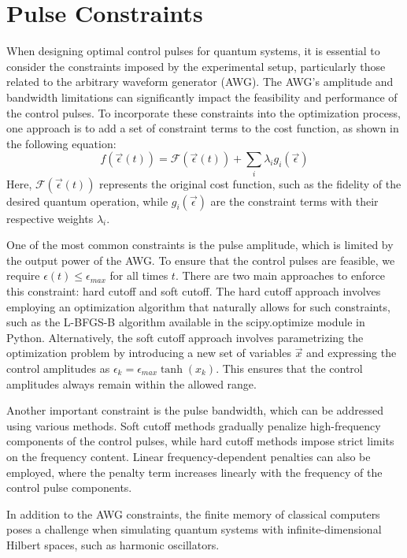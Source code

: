 \documentclass[12pt]{report}
\begin{document}
\section{Pulse Constraints} \label{sec:pulse_constraints}
When designing optimal control pulses for quantum systems, it is essential to consider the constraints imposed by the experimental setup, particularly those related to the arbitrary waveform generator (AWG). 
The AWG's amplitude and bandwidth limitations can significantly impact the feasibility and performance of the control pulses. 
To incorporate these constraints into the optimization process, one approach is to add a set of constraint terms to the cost function, as shown in the following equation:
\begin{equation*}
    f(\vec{\epsilon}(t)) = \mathcal{F}(\vec{\epsilon}(t)) + \sum_i \lambda_i g_i(\vec{\epsilon})
\end{equation*}
Here, $\mathcal{F}(\vec{\epsilon}(t))$ represents the original cost function, such as the fidelity of the desired quantum operation, while $g_i(\vec{\epsilon})$ are the constraint terms with their respective weights $\lambda_i$.
\par
One of the most common constraints is the pulse amplitude, which is limited by the output power of the AWG. 
To ensure that the control pulses are feasible, we require $\epsilon(t) \le \epsilon_{max}$ for all times $t$. 
There are two main approaches to enforce this constraint: hard cutoff and soft cutoff. 
The hard cutoff approach involves employing an optimization algorithm that naturally allows for such constraints, such as the L-BFGS-B algorithm available in the scipy.optimize module in Python. 
Alternatively, the soft cutoff approach involves parametrizing the optimization problem by introducing a new set of variables $\vec{x}$ and expressing the control amplitudes as $\epsilon_k = \epsilon_{max} \tanh{(x_k)}$. 
This ensures that the control amplitudes always remain within the allowed range.
\par
Another important constraint is the pulse bandwidth, which can be addressed using various methods. 
Soft cutoff methods gradually penalize high-frequency components of the control pulses, while hard cutoff methods impose strict limits on the frequency content. 
Linear frequency-dependent penalties can also be employed, where the penalty term increases linearly with the frequency of the control pulse components.
\par
In addition to the AWG constraints, the finite memory of classical computers poses a challenge when simulating quantum systems with infinite-dimensional Hilbert spaces, such as harmonic oscillators. 
\end{document}
